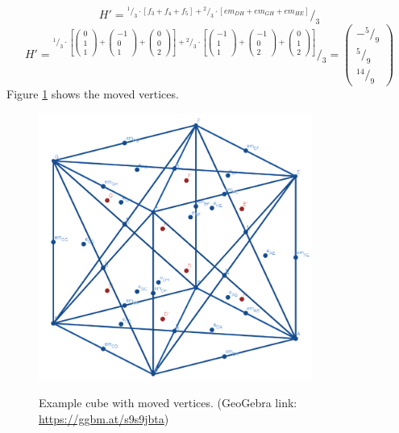 \documentclass{article}
\newcommand*\rfrac[2]{{}^{#1}\!/_{#2}}%
\begin{document}
\[H'=\rfrac{\rfrac{1}{3}\cdot\left[f_3+f_4+f_5\right]+
\rfrac{2}{3}\cdot\left[em_{DH}+em_{GH}+em_{HE}\right]
}{3}\]
\[H'=\rfrac{\rfrac{1}{3}\cdot\left[
\left({\begin{array}{c} 0 \\  1 \\ 1 \end{array}}\right)+
\left({\begin{array}{c} -1 \\  0 \\ 1 \end{array}}\right)+
\left({\begin{array}{c} 0 \\  0 \\ 2 \end{array}}\right)\right]+
\rfrac{2}{3}\cdot\left[
\left({\begin{array}{c} -1 \\  1 \\ 1 \end{array}}\right)+
\left({\begin{array}{c} -1 \\  0 \\ 2 \end{array}}\right)+
\left({\begin{array}{c} 0 \\  1 \\ 2 \end{array}}\right)\right]
}{3}=\left({\begin{array}{c} -\rfrac{5}{9} \\  \rfrac{5}{9} \\ \rfrac{14}{9} \end{array}}\right)\]
Figure \ref{fig:cube6} shows the moved vertices.
\begin{figure}[H]
\caption{Example cube with moved vertices. (GeoGebra link: \href{https://ggbm.at/s9s9jbta}{https://ggbm.at/s9s9jbta})}
\centering
\includegraphics[width=0.8\textwidth]{images/cl-06.png}
\label{fig:cube6}
\end{figure}
\end{document}
